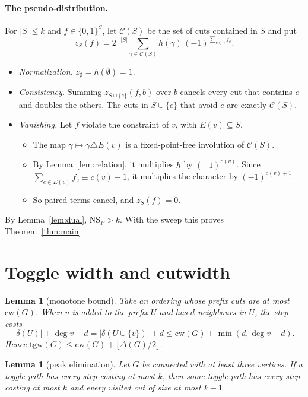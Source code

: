 \documentclass[11pt]{article}
\newtheorem{lemma}[theorem]{Lemma}
\theoremstyle{definition}
\theoremstyle{remark}
\newcommand{\NS}{\mathrm{NS}}
\newcommand{\tgw}{\mathrm{tgw}}
\newcommand{\cw}{\mathrm{cw}}
\begin{document}
\paragraph{The pseudo-distribution.} For $|S|\le k$ and $f\in\{0,1\}^S$, let
$\mathcal C(S)$ be the set of cuts contained in $S$ and put
\[
z_S(f)=2^{-|S|}\sum_{\gamma\in\mathcal C(S)}h(\gamma)\,(-1)^{\sum_{e\in\gamma}f_e}.
\]
\begin{itemize}
\item \emph{Normalization.} $z_\emptyset=h(\emptyset)=1$.
\item \emph{Consistency.} Summing $z_{S\cup\{e\}}(f,b)$ over $b$ cancels every
cut that contains $e$ and doubles the others. The cuts in $S\cup\{e\}$ that
avoid $e$ are exactly $\mathcal C(S)$.
\item \emph{Vanishing.} Let $f$ violate the constraint of $v$, with
$E(v)\subseteq S$.
\begin{itemize}
\item The map $\gamma\mapsto\gamma\triangle E(v)$ is a fixed-point-free
involution of $\mathcal C(S)$.
\item By Lemma~\ref{lem:relation}, it multiplies $h$ by $(-1)^{c(v)}$. Since
$\sum_{e\in E(v)}f_e\equiv c(v)+1$, it multiplies the character by
$(-1)^{c(v)+1}$.
\item So paired terms cancel, and $z_S(f)=0$.
\end{itemize}
\end{itemize}
By Lemma~\ref{lem:dual}, $\NS_F>k$. With the sweep this proves
Theorem~\ref{thm:main}.

\section{Toggle width and cutwidth}

\begin{lemma}[monotone bound]
Take an ordering whose prefix cuts are at most $\cw(G)$. When $v$ is added to
the prefix $U$ and has $d$ neighbours in $U$, the step costs
\[
|\delta(U)|+\deg v-d=|\delta(U\cup\{v\})|+d\le\cw(G)+\min(d,\deg v-d).
\]
Hence $\tgw(G)\le\cw(G)+\lfloor\Delta(G)/2\rfloor$.
\end{lemma}

\begin{lemma}[peak elimination]\label{lem:peaks}
Let $G$ be connected with at least three vertices. If a toggle path has every
step costing at most $k$, then some toggle path has every step costing at most
$k$ and every visited cut of size at most $k-1$.
\end{lemma}
\end{document}
